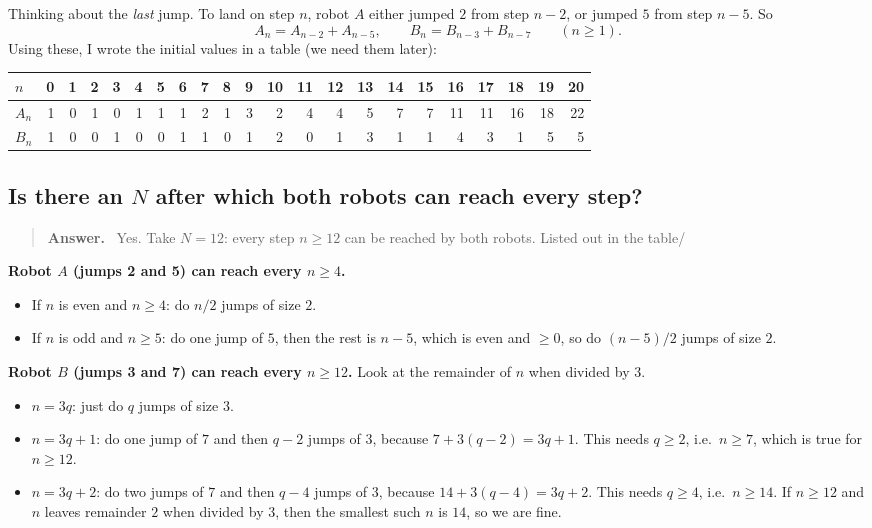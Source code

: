 \documentclass[11pt,a4paper]{article}
\renewcommand{\arraystretch}{1.15}
\newenvironment{answerbox}[1][Answer]{\par\smallskip\begin{quote}\textbf{#1.}\ }{\end{quote}}
\theoremstyle{definition}
\begin{document}
Thinking about the \emph{last} jump. To land on step $n$, robot $A$ either jumped $2$ from step $n-2$, or jumped $5$ from step $n-5$. So 
\[
A_n=A_{n-2}+A_{n-5},\qquad B_n=B_{n-3}+B_{n-7}\qquad(n\ge1).
\]
Using these, I wrote the initial values in a table (we need them later):
\begin{center}\small
\renewcommand{\arraystretch}{1.15}
\setlength{\tabcolsep}{4.5pt}
\begin{tabular}{@{}l|*{21}{r}@{}}
$n$ & 0&1&2&3&4&5&6&7&8&9&10&11&12&13&14&15&16&17&18&19&20\\\hline
$A_n$ & 1&0&1&0&1&1&1&2&1&3&2&4&4&5&7&7&11&11&16&18&22\\
$B_n$ & 1&0&0&1&0&0&1&1&0&1&2&0&1&3&1&1&4&3&1&5&5\\
\end{tabular}
\end{center}

\subsection{Is there an $N$ after which both robots can reach every step?}
\begin{answerbox}
Yes. Take $N=12$: every step $n\ge12$ can be reached by both robots. Listed out in the table/
\end{answerbox}

\textbf{Robot $A$ (jumps 2 and 5) can reach every $n\ge4$.}
\begin{itemize}
  \item If $n$ is even and $n\ge4$: do $n/2$ jumps of size $2$.
  \item If $n$ is odd and $n\ge5$: do one jump of $5$, then the rest is $n-5$, which is even and $\ge0$, so do $(n-5)/2$ jumps of size $2$.
\end{itemize}

\textbf{Robot $B$ (jumps 3 and 7) can reach every $n\ge12$.} Look at the remainder of $n$ when divided by $3$.
\begin{itemize}
  \item $n=3q$: just do $q$ jumps of size $3$.
  \item $n=3q+1$: do one jump of $7$ and then $q-2$ jumps of $3$, because $7+3(q-2)=3q+1$. This needs $q\ge2$, i.e.\ $n\ge7$, which is true for $n\ge12$.
  \item $n=3q+2$: do two jumps of $7$ and then $q-4$ jumps of $3$, because $14+3(q-4)=3q+2$. This needs $q\ge4$, i.e.\ $n\ge14$.
        If $n\ge12$ and $n$ leaves remainder $2$ when divided by $3$, then the smallest such $n$ is $14$, so we are fine.
\end{itemize}
\end{document}
